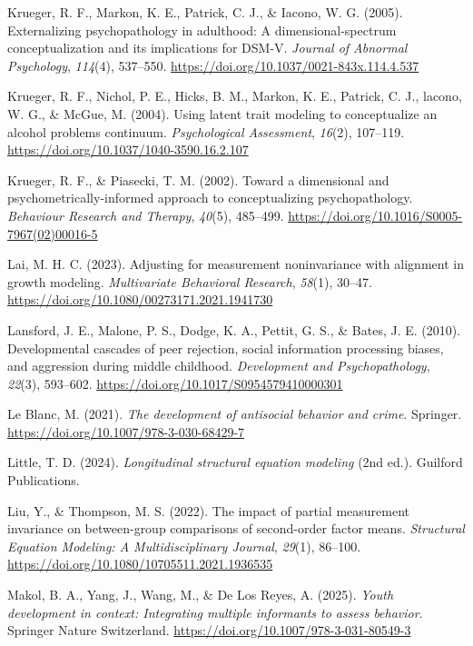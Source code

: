 \documentclass[
  american,
  letterpaper,
  12pt]{article}
\newlength{\cslhangindent}
\newenvironment{CSLReferences}[2] %
 {\begin{list}{}{%
  \setlength{\itemindent}{0pt}
  \setlength{\leftmargin}{0pt}
  \setlength{\parsep}{0pt}
  \ifodd #1
   \setlength{\leftmargin}{\cslhangindent}
   \setlength{\itemindent}{-1\cslhangindent}
  \fi
  \setlength{\itemsep}{#2\baselineskip}}}
 {\end{list}}
\begin{document}
\begin{CSLReferences}{1}{0}
Krueger, R. F., Markon, K. E., Patrick, C. J., \& Iacono, W. G. (2005).
Externalizing psychopathology in adulthood: {A} dimensional-spectrum
conceptualization and its implications for {DSM-V}. \emph{Journal of
Abnormal Psychology}, \emph{114}(4), 537--550.
\url{https://doi.org/10.1037/0021-843x.114.4.537}

{Krueger, R. F., Nichol, P. E., Hicks, B. M., Markon, K. E., Patrick, C.
J., lacono, W. G., \& McGue, M.} (2004). Using latent trait modeling to
conceptualize an alcohol problems continuum. \emph{Psychological
Assessment}, \emph{16}(2), 107--119.
\url{https://doi.org/10.1037/1040-3590.16.2.107}

Krueger, R. F., \& Piasecki, T. M. (2002). Toward a dimensional and
psychometrically-informed approach to conceptualizing psychopathology.
\emph{Behaviour Research and Therapy}, \emph{40}(5), 485--499.
\url{https://doi.org/10.1016/S0005-7967(02)00016-5}

Lai, M. H. C. (2023). Adjusting for measurement noninvariance with
alignment in growth modeling. \emph{Multivariate Behavioral Research},
\emph{58}(1), 30--47.
\url{https://doi.org/10.1080/00273171.2021.1941730}

Lansford, J. E., Malone, P. S., Dodge, K. A., Pettit, G. S., \& Bates,
J. E. (2010). Developmental cascades of peer rejection, social
information processing biases, and aggression during middle childhood.
\emph{Development and Psychopathology}, \emph{22}(3), 593--602.
\url{https://doi.org/10.1017/S0954579410000301}

Le Blanc, M. (2021). \emph{The development of antisocial behavior and
crime}. Springer. \url{https://doi.org/10.1007/978-3-030-68429-7}

Little, T. D. (2024). \emph{Longitudinal structural equation modeling}
(2nd ed.). Guilford Publications.

Liu, Y., \& Thompson, M. S. (2022). The impact of partial measurement
invariance on between-group comparisons of second-order factor means.
\emph{Structural Equation Modeling: A Multidisciplinary Journal},
\emph{29}(1), 86--100.
\url{https://doi.org/10.1080/10705511.2021.1936535}

Makol, B. A., Yang, J., Wang, M., \& De Los Reyes, A. (2025).
\emph{Youth development in context: {Integrating} multiple informants to
assess behavior}. Springer Nature Switzerland.
\url{https://doi.org/10.1007/978-3-031-80549-3}


\end{CSLReferences}
\end{document}
